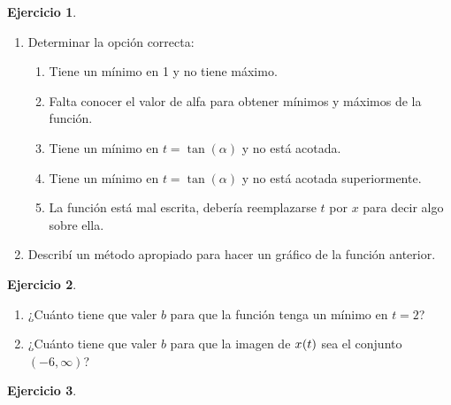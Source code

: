 \documentclass[a4paper,12pt,twoside]{book}
\newtheorem{ejercicio}{{Ejercicio}}[chapter]
\begin{document}
\begin{mdframed}[style=ejercicio-facil]
    \begin{ejercicio}
    \end{ejercicio}
    \begin{enumerate}
        \item Determinar la opción correcta:
        \begin{enumerate}
            \item Tiene un mínimo en 1 y no tiene máximo.
            \item Falta conocer el valor de alfa para obtener mínimos y máximos de la función.
            \item Tiene un mínimo en $t = \tan(\alpha)$ y no está acotada.
            \item Tiene un mínimo en $t = \tan(\alpha)$ y no está acotada superiormente.
            \item La función está mal escrita, debería reemplazarse $t$ por $x$ para decir algo sobre ella.
        \end{enumerate}

        \item Describí un método apropiado para hacer un gráfico de la función anterior.
    \end{enumerate}
    
\end{mdframed}

\begin{mdframed}[style=ejercicio-facil]
    \begin{ejercicio}
    \end{ejercicio}
    \begin{enumerate}
        \item ¿Cuánto tiene que valer $b$ para que la función tenga un mínimo en $t=2$?
        \item ¿Cuánto tiene que valer $b$ para que la imagen de $\fx[x]{t}$ sea el conjunto $(-6,\infty)$?
    \end{enumerate}
\end{mdframed}

\begin{mdframed}[style=ejercicio-facil]
    \begin{ejercicio}
    \end{ejercicio}
\end{mdframed}
\end{document}
